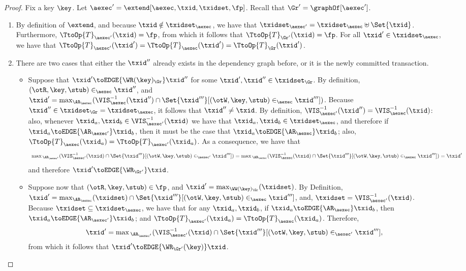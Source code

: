 \begin{proof}
Fix a key $\key$. Let $\aexec' = \extend[\aexec, \txid, \txidset, \fp]$. Recall that $\Gr' = \graphOf[\aexec']$.

\begin{enumerate}
\item By definition of $\extend$, and 
because $\txid \notin \txidset_{\aexec}$, we have that 
$\txidset_{\aexec'} = \txidset_{\aexec} \uplus \Set{\txid}$. Furthermore, $\TtoOp{T}_{\aexec'}(\txid) = \fp$, 
from which it follows that $\TtoOp{T}_{\Gr'}(\txid) = \fp$.
For all $\txid' \in \txidset_{\aexec}$, we have that $\TtoOp{T}_{\aexec'}(\txid') = 
\TtoOp{T}_{\aexec}(\txid') = \TtoOp{T}_{\Gr}(\txid')$.
\item
There are two cases that either the \( \txid'' \) already exists in the dependency graph before,
or it is the newly committed transaction.
\begin{itemize}
\item Suppose that $\txid' \toEDGE{\WR(\key)_{\Gr}} \txid''$ for some $\txid', \txid'' \in \txidset_{\Gr}$. 
By definition, $(\otR, \key, \stub) \in_{\aexec} \txid''$,  
and $\txid' = \max_{\AR_{\aexec}}(\VIS_{\aexec}^{-1}(\txid'') \cap \Set{\txid'''}[(\otW, \key, \stub) \in_{\aexec} \txid'''])$. 
Because $\txid'' \in \txidset_{\Gr} = \txidset_{\aexec}$, it follows that $\txid'' \neq \txid$. By definition, 
$\VIS^{-1}_{\aexec'}(\txid'') = \VIS^{-1}_{\aexec}(\txid)$: also, whenever 
$\txid_{a}, \txid_{b} \in \VIS^{-1}_{\aexec'}(\txid)$ we have that $\txid_{a}, \txid_{b} \in \txidset_{\aexec}$, 
and therefore if $\txid_{a} \toEDGE{\AR_{\aexec'}} \txid_{b}$, then it must be the case 
that $\txid_{a} \toEDGE{\AR_{\aexec}} \txid_b$; also, $\TtoOp{T}_{\aexec}(\txid_{a}) = \TtoOp{T}_{\aexec'}(\txid_{a})$. 
As a consequence, we have that 
\[
    \begin{array}{l}
        \max{}_{\AR_{\aexec'}}(\VIS^{-1}_{\aexec'}(\txid) \cap \Set{ \txid'''}[(\otW, \key, \stub) \in_{\aexec'} \txid''']) =
        \max{}_{\AR_{\aexec}}(\VIS^{-1}_{\aexec}(\txid) \cap \Set{\txid'''}[(\otW, \key, \stub) \in_{\aexec} \txid''']) = \txid'
    \end{array}
\] 
and therefore $\txid' \toEDGE{\WR_{\Gr'}} \txid$. 

\item Suppose now that $(\otR,\key, \stub) \in \fp$, and $\txid' = \max_{\WW(\key)_{\Gr}}(\txidset)$. 
    By Definition, $\txid' = \max_{\AR_{\aexec}}(\txidset) \cap \Set{\txid'''}[(\otW, \key, \stub) \in_{\aexec} \txid''']$, 
and, $\txidset = \VIS^{-1}_{\aexec'}(\txid)$.
Because $\txidset \subseteq \txidset_{\aexec}$, we have 
that for any $\txid_{a}, \txid_{b}$, if $\txid_{a} \toEDGE{\AR_{\aexec}} \txid_{b}$, 
then $\txid_{a} \toEDGE{\AR_{\aexec'}} \txid_{b}$; and $\TtoOp{T}_{\aexec'}(\txid_{a}) = 
\TtoOp{T}_{\aexec}(\txid_a)$. Therefore, 
\[
    \txid' = \max{}_{\AR_{\aexec'}}(\VIS^{-1}_{\aexec'}(\txid) \cap \Set{\txid'''}[(\otW, \key, \stub) \in_{\aexec'} \txid'''], 
\] 
from which it follows that $\txid' \toEDGE{\WR_{\Gr'}(\key)}\txid$.


\end{itemize}
\end{enumerate}
\end{proof}

